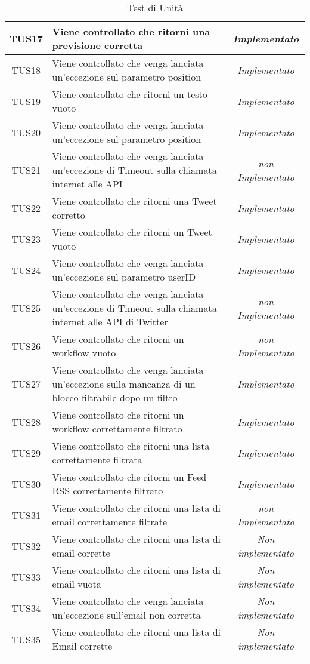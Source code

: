 \begin{longtable}{|c|m{12em}|c|}
TUS17 & Viene controllato che ritorni una previsione corretta & \textit{Implementato}\\ \hline
TUS18 & Viene controllato che venga lanciata un'eccezione sul parametro position & \textit{Implementato}\\ \hline
TUS19 & Viene controllato che ritorni un testo vuoto & \textit{Implementato}\\ \hline
TUS20 & Viene controllato che venga lanciata un'eccezione sul parametro position & \textit{Implementato}\\ \hline
TUS21 & Viene controllato che venga lanciata un'eccezione di Timeout sulla chiamata internet alle API & \textit{non Implementato}\\ \hline
TUS22 & Viene controllato che ritorni una Tweet corretto & \textit{Implementato}\\ \hline
TUS23 & Viene controllato che ritorni un Tweet vuoto & \textit{Implementato}\\ \hline
TUS24 & Viene controllato che venga lanciata un'eccezione sul parametro userID & \textit{Implementato}\\ \hline
TUS25 & Viene controllato che venga lanciata un'eccezione di Timeout sulla chiamata internet alle API di Twitter & \textit{non Implementato}\\ \hline
TUS26 & Viene controllato che ritorni un workflow vuoto & \textit{non Implementato}\\ \hline
TUS27 & Viene controllato che venga lanciata un'eccezione sulla mancanza di un blocco filtrabile dopo un filtro & \textit{Implementato}\\ \hline
TUS28 & Viene controllato che ritorni un workflow correttamente filtrato & \textit{Implementato}\\ \hline
TUS29 & Viene controllato che ritorni una lista correttamente filtrata & \textit{Implementato}\\ \hline
TUS30 & Viene controllato che ritorni un Feed RSS correttamente filtrato & \textit{Implementato}\\ \hline
TUS31 & Viene controllato che ritorni una lista di email correttamente filtrate & \textit{non Implementato}\\ \hline
TUS32 & Viene controllato che ritorni una lista di email corrette & \textit{Non implementato}\\ \hline
TUS33 & Viene controllato che ritorni una lista di email vuota & \textit{Non implementato}\\ \hline
TUS34 & Viene controllato che venga lanciata un'eccezione sull'email non corretta & \textit{Non implementato}\\ \hline
TUS35 & Viene controllato che ritorni una lista di Email corrette & \textit{Non implementato}\\ \hline
\caption[Test di Unità]{Test di Unità}
\label{tabella:test2}
\end{longtable}
\clearpage


